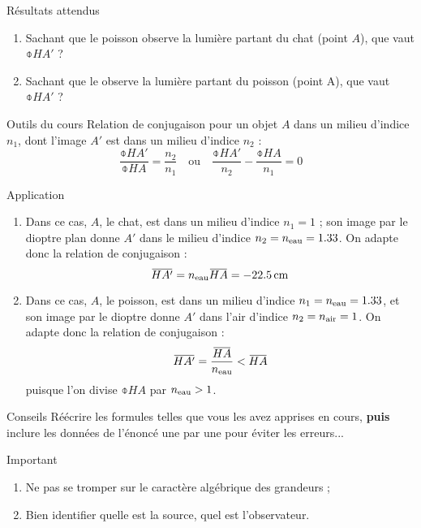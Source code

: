 \documentclass[10pt,a5paper,notitlepage]{book}
\begin{document}
\begin{NCprop}{Résultats attendus}
    \begin{enumerate}
        \item Sachant que le poisson observe la lumière partant du chat (point
            $A$), que vaut $\obar{HA'}$ ?
        \item Sachant que le  observe la lumière partant du poisson
            (point A), que vaut $\obar{HA'}$ ?
    \end{enumerate}
\end{NCprop}

\begin{NCdemo}{Outils du cours}
    Relation de conjugaison pour un objet $A$ dans un milieu d'indice $n_1$,
    dont l'image $A'$ est dans un milieu d'indice $n_2$ :
    \[ \frac{\obar{HA'}}{\obar{HA}} = \frac{n_2}{n_1} \quad \mathrm{ou} \quad
    \frac{\obar{HA'}}{n_2} - \frac{\obar{HA}}{n_1} = 0 \]
\end{NCdemo}

\begin{NCexem}{Application}
    \begin{enumerate}
        \item Dans ce cas, $A$, le chat, est dans un milieu d'indice $n_1 = 1$ ;
            son image par le dioptre plan donne $A'$ dans le milieu d'indice
            $n_2 = n _{\text{eau}} = 1.33$. On adapte donc la relation de conjugaison
            :
        \[ \obar{HA'} = n \St{eau}\obar{HA} = \SI{-22.5}{cm}\]
        \item Dans ce cas, $A$, le poisson, est dans un milieu d'indice $n_1 = n
            _{\text{eau}} = 1.33$, et son image par le dioptre donne $A'$ dans l'air
            d'indice $n_2 = n _{\text{air}} = 1$. On adapte donc la relation de
            conjugaison :
            \[ \obar{HA'} = \frac{\obar{HA}}{n \St{eau}} < \obar{HA} \]
            puisque l'on divise $\obar{HA}$ par $n _{\text{eau}} > 1$.
    \end{enumerate}
\end{NCexem}

\begin{NCcoro}{Conseils}
    Réécrire les formules telles que vous les avez apprises en cours,
    \textbf{puis} inclure les données de l'énoncé une par une pour éviter les
    erreurs...
\end{NCcoro}

\begin{NCimpo}{Important}
    \begin{enumerate}
        \item Ne pas se tromper sur le caractère {\huge algébrique} des
            grandeurs ;
        \item Bien identifier quelle est la source, quel est l'observateur.
    \end{enumerate}
\end{NCimpo}
\end{document}
